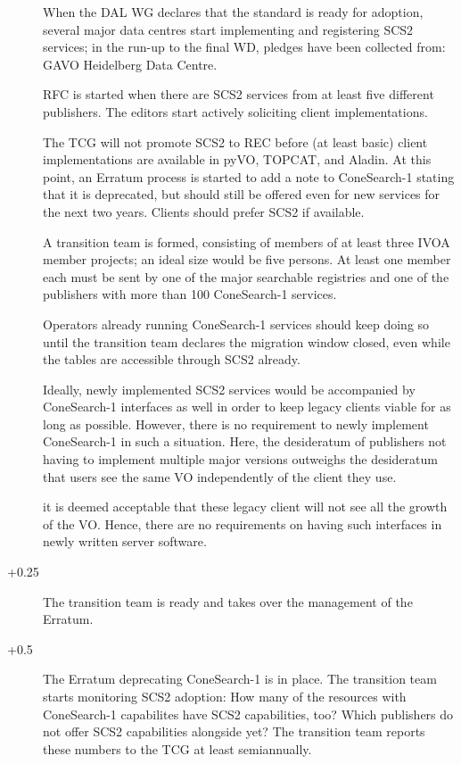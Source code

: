 \documentclass[11pt,a4paper]{ivoa}
\begin{document}
\begin{description}
\item[] When the DAL WG declares that the standard is ready
for adoption, several major data centres start implementing and
registering SCS2 services; in the run-up to the final WD, pledges have
been collected from: GAVO Heidelberg Data
Centre.

\item[] RFC is started when there are SCS2 services from at
least five different publishers.  The editors start actively soliciting
client implementations.

\item[] The TCG will not promote SCS2 to REC before (at least
basic) client implementations are available in pyVO, TOPCAT, and Aladin.
At this point, an Erratum process is started to add a note to
ConeSearch-1 stating that it is deprecated, but should still be offered
even for new services for the next two years.  Clients should prefer
SCS2 if available.

A transition team is formed, consisting of members of at least three
IVOA member projects; an ideal size would be five persons.  At least one
member each must be sent by one of the major searchable registries and
one of the publishers with more than 100 ConeSearch-1 services.

Operators already running ConeSearch-1 services should keep doing so
until the transition team declares the migration window closed, even
while the tables are accessible through SCS2 already.

Ideally, newly implemented SCS2 services would be accompanied by
ConeSearch-1 interfaces as well in order to keep legacy clients viable
for as long as possible.  However, there is no requirement to newly
implement ConeSearch-1 in such a situation.  Here, the desideratum of
publishers not having to implement multiple major versions outweighs the
desideratum that users see the same VO independently of the client they
use.

it is deemed acceptable that these legacy client will
not see all the growth of the VO.  Hence, there are no requirements on
having such interfaces in newly written server software.

\item[+0.25] The transition team is ready and takes over the
management of the Erratum.

\item[+0.5] The Erratum deprecating ConeSearch-1 is in place.  The
transition team starts monitoring SCS2 adoption: How many of the
resources with ConeSearch-1 capabilites have SCS2 capabilities, too?
Which publishers do not offer SCS2 capabilities alongside yet?  The
transition team reports these numbers to the TCG at least semiannually.


\end{description}
\end{document}
